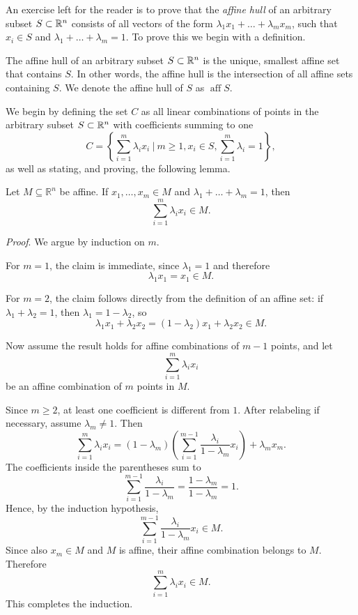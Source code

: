 An exercise left for the reader is to prove that the \textit{affine hull} of an arbitrary subset $S \subset \mathbb{R}^n$ consists of all vectors of the form $\lambda_1 x_1 + \dots + \lambda_m x_m$, such that $x_i \in S$ and $\lambda_1 + \dots + \lambda_m = 1$.
To prove this we begin with a definition.
\begin{Def}
    The affine hull of an arbitrary subset $S \subset \mathbb{R}^n$ is the unique, smallest affine set that contains $S$. 
    In other words, the affine hull is the intersection of all affine sets containing $S$.
    We denote the affine hull of $S$ as $\operatorname{aff} S$.
\end{Def}

We begin by defining the set $C$ as all linear combinations of points in the arbitrary subset $S \subset \mathbb{R}^n$ with coefficients summing to one
\[
    C = \left\{ \sum_{i = 1}^m \lambda_i x_i \> | \> m \geq 1, x_i \in S, \sum_{i = 1}^m \lambda_i = 1  \right\},
\]
as well as stating, and proving, the following lemma.
\begin{Lma}
  Let $M \subseteq \mathbb{R}^n$ be affine. If $x_1,\dots,x_m \in M$ and
  $\lambda_1+\dots+\lambda_m = 1$, then
  \[
      \sum_{i=1}^m \lambda_i x_i \in M.
  \]
  \end{Lma}

  \textit{Proof}. We argue by induction on $m$.

  For $m=1$, the claim is immediate, since $\lambda_1 = 1$ and therefore
  \[
      \lambda_1 x_1 = x_1 \in M.
  \]

  For $m=2$, the claim follows directly from the definition of an affine set:
  if $\lambda_1+\lambda_2=1$, then $\lambda_1 = 1-\lambda_2$, so
  \[
      \lambda_1 x_1 + \lambda_2 x_2
      =
      (1-\lambda_2)x_1 + \lambda_2 x_2
      \in M.
  \]

  Now assume the result holds for affine combinations of $m-1$ points, and
  let
  \[
      \sum_{i=1}^m \lambda_i x_i
  \]
  be an affine combination of $m$ points in $M$.

  Since $m \geq 2$, at least one coefficient is different from $1$.
  After relabeling if necessary, assume $\lambda_m \neq 1$. Then
  \[
      \sum_{i=1}^m \lambda_i x_i
      =
      (1-\lambda_m)
      \left(
          \sum_{i=1}^{m-1}
          \frac{\lambda_i}{1-\lambda_m}x_i
      \right)
      +
      \lambda_m x_m.
  \]
  The coefficients inside the parentheses sum to
  \[
      \sum_{i=1}^{m-1}
      \frac{\lambda_i}{1-\lambda_m}
      =
      \frac{1-\lambda_m}{1-\lambda_m}
      =
      1.
  \]
  Hence, by the induction hypothesis,
  \[
      \sum_{i=1}^{m-1}
      \frac{\lambda_i}{1-\lambda_m}x_i
      \in M.
  \]
  Since also $x_m \in M$ and $M$ is affine, their affine combination belongs
  to $M$. Therefore
  \[
      \sum_{i=1}^m \lambda_i x_i \in M.
  \]
  This completes the induction. \hfill\sq

